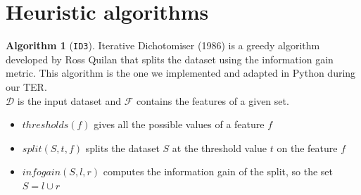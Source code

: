 \documentclass[12pt]{report}
\theoremstyle{definition}
\theoremstyle{definition}
\newtheorem*{algo}{Algorithm}
\theoremstyle{definition}
\begin{document}
\section{Heuristic algorithms}
\begin{algo}[\texttt{ID3}]
    Iterative Dichotomiser (1986) \cite{wiki-decision-tree} is a greedy algorithm developed by Ross Quilan that splits
    the dataset using the information gain metric. This algorithm is the one we implemented and adapted in Python during
    our TER.\\
    $\mathcal{D}$ is the input dataset and $\mathcal{F}$ contains the features of a given set.

    \begin{algorithm}
        \caption{\texttt{ID3}}\label{alg:two}
        \DontPrintSemicolon

        \;
        \;

    \end{algorithm}

    \begin{itemize}
        \item $thresholds(f)$ gives all the possible values of a feature $f$
        \item $split(S, t, f)$ splits the dataset $S$ at the threshold value $t$ on the feature $f$
        \item $infogain(S, l, r)$ computes the information gain of the split, so the set $S = l \cup r$
    \end{itemize}
\end{algo}
\end{document}
